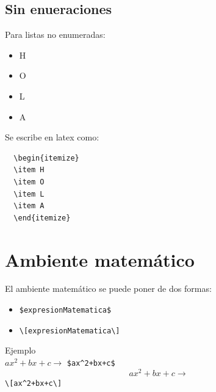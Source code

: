 \documentclass[11pt]{article} %
\begin{document}
\subsection{Sin enueraciones}
Para listas no enumeradas:
\begin{itemize}
\item H
\item O
\item L
\item A
\end{itemize}
Se escribe en latex como:
\begin{verbatim}
  \begin{itemize}
  \item H
  \item O
  \item L
  \item A
  \end{itemize}
\end{verbatim}

\section{Ambiente matemático}
El ambiente matemático se puede poner de dos formas:

\begin{itemize}
\item \verb!$expresionMatematica$!
\item \verb!\[expresionMatematica\]!
\end{itemize}

Ejemplo\\
$ax^2+bx+c \to$ \verb!$ax^2+bx+c$!
\[ax^2+bx+c \to\] \verb!\[ax^2+bx+c\]!
\end{document}
